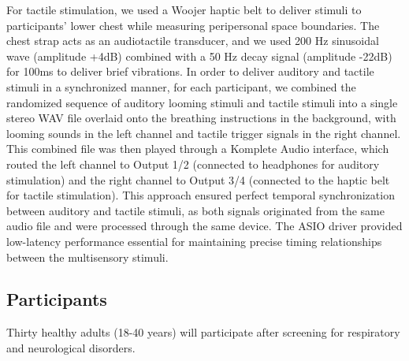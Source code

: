 For tactile stimulation, we used a Woojer haptic belt to deliver stimuli to participants' lower chest while measuring peripersonal space boundaries. The chest strap acts as an audiotactile transducer, and we used 200 Hz sinusoidal wave (amplitude +4dB) combined with a 50 Hz decay signal (amplitude -22dB) for 100ms to deliver brief vibrations. In order to deliver auditory and tactile stimuli in a synchronized manner, for each participant, we combined the randomized sequence of auditory looming stimuli and tactile stimuli into a single stereo WAV file overlaid onto the breathing instructions in the background, with looming sounds in the left channel and tactile trigger signals in the right channel. This combined file was then played through a Komplete Audio interface, which routed the left channel to Output 1/2 (connected to headphones for auditory stimulation) and the right channel to Output 3/4 (connected to the haptic belt for tactile stimulation). This approach ensured perfect temporal synchronization between auditory and tactile stimuli, as both signals originated from the same audio file and were processed through the same device. The ASIO driver provided low-latency performance essential for maintaining precise timing relationships between the multisensory stimuli.

\subsection{Participants}
Thirty healthy adults (18-40 years) will participate after screening for respiratory and neurological disorders.
